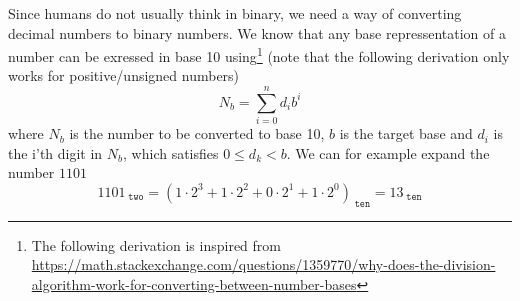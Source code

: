     Since humans do not usually think in binary, we need a way of converting decimal numbers to binary numbers. We know that any base repressentation of a number can be exressed in base 10 using\footnote{The following derivation is inspired from \\\url{https://math.stackexchange.com/questions/1359770/why-does-the-division-algorithm-work-for-converting-between-number-bases}} (note that the following derivation only works for positive/unsigned numbers) 
    \begin{equation}\label{Eq:baseXToDecimal}
        N_b = \sum_{i=0}^{n} d_i b^i
    \end{equation}
    where $N_b$ is the number to be converted to base 10, $b$ is the target base and $d_i$ is the i'th digit in $N_b$, which satisfies $0 \leq d_k < b$. We can for example expand the number $1101$
    \begin{equation}\label{Eq:bintodecimal}
        1101_{\;\texttt{two}} = (1 \cdot 2^3 + 1 \cdot 2^2 + 0\cdot 2^1 + 1\cdot 2^0)_{\;\texttt{ten}} = 13_{\;\texttt{ten}}
    \end{equation}
    
